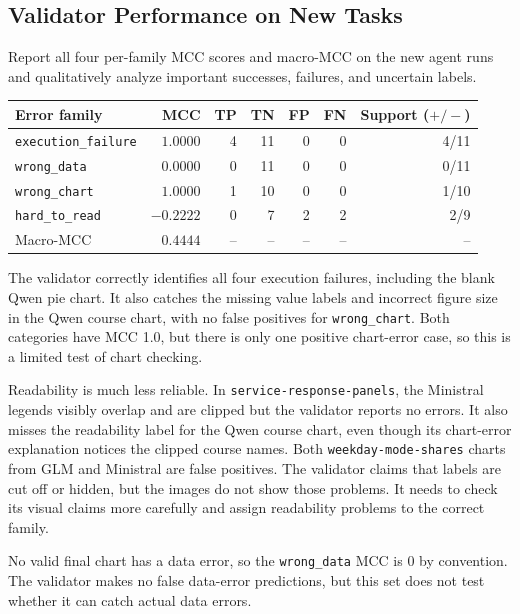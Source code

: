 \documentclass[11pt]{article}
\begin{document}
\subsection{Validator Performance on New Tasks}
Report all four per-family MCC scores and macro-MCC on the new agent runs and qualitatively
analyze important successes, failures, and uncertain labels.

\medskip
\begin{center}
\begin{tabular}{lrrrrrr}
\toprule
Error family & MCC & TP & TN & FP & FN & Support ($+/-$) \\
\midrule
\texttt{execution\_failure} & $1.0000$ & 4 & 11 & 0 & 0 & 4/11 \\
\texttt{wrong\_data} & $0.0000$ & 0 & 11 & 0 & 0 & 0/11 \\
\texttt{wrong\_chart} & $1.0000$ & 1 & 10 & 0 & 0 & 1/10 \\
\texttt{hard\_to\_read} & $-0.2222$ & 0 & 7 & 2 & 2 & 2/9 \\
\midrule
Macro-MCC & $0.4444$ & -- & -- & -- & -- & -- \\
\bottomrule
\end{tabular}
\end{center}

The validator correctly identifies all four execution failures, including the
blank Qwen pie chart. It also catches the missing value labels and incorrect
figure size in the Qwen course chart, with no false positives for
\texttt{wrong\_chart}. Both categories have MCC 1.0, but there is only one
positive chart-error case, so this is a limited test of chart checking.

Readability is much less reliable. In \texttt{service-response-panels}, the
Ministral legends visibly overlap and are clipped but the validator reports no
errors. It also misses the readability label for the Qwen course chart, even
though its chart-error explanation notices the clipped course names. Both
\texttt{weekday-mode-shares} charts from GLM and Ministral are false positives.
The validator claims that labels are cut off or hidden, but the images do not
show those problems. It needs to check its visual claims more carefully and
assign readability problems to the correct family.

No valid final chart has a data error, so the \texttt{wrong\_data} MCC is 0 by
convention. The validator makes no false data-error predictions, but this set
does not test whether it can catch actual data errors.
\end{document}
